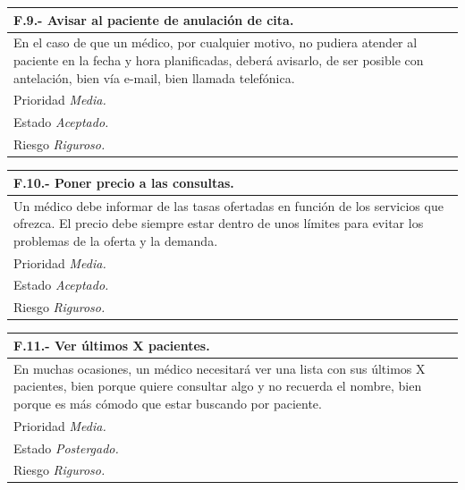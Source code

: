 \documentclass[a4paper,oneside,11pt]{book}
\begin{document}
\begin{center}
\begin{tabulary}{15cm}{|L|}
	\hline
		\bf{F.9.- Avisar al paciente de anulación de cita.} \\
	\hline
		En el caso de que un médico, por cualquier motivo, no pudiera atender al paciente en la fecha y hora planificadas, deberá avisarlo, de ser posible con antelación, bien vía e-mail, bien llamada telefónica. \\
	\hline
		Prioridad \textit{Media.} \\
	\hline
		Estado \textit{Aceptado.} \\
	\hline
		Riesgo \textit{Riguroso.} \\
	\hline
\end{tabulary}
\end{center}

\begin{center}
\begin{tabulary}{15cm}{|L|}
	\hline
		\bf{F.10.- Poner precio a las consultas.} \\
	\hline
		Un médico debe informar de las tasas ofertadas en función de los servicios que ofrezca. El precio debe siempre estar dentro de unos límites para evitar los problemas de la oferta y la demanda. \\
	\hline
		Prioridad \textit{Media.} \\
	\hline
		Estado \textit{Aceptado.} \\
	\hline
		Riesgo \textit{Riguroso.} \\
	\hline
\end{tabulary}
\end{center}

\begin{center}
\begin{tabulary}{15cm}{|L|}
	\hline
		\bf{F.11.- Ver últimos X pacientes.} \\
	\hline
		En muchas ocasiones, un médico necesitará ver una lista con sus últimos X pacientes, bien porque quiere consultar algo y no recuerda el nombre, bien porque es más cómodo que estar buscando por paciente. \\
	\hline
		Prioridad \textit{Media.} \\
	\hline
		Estado \textit{Postergado.} \\
	\hline
		Riesgo \textit{Riguroso.} \\
	\hline
\end{tabulary}
\end{center}
\end{document}
